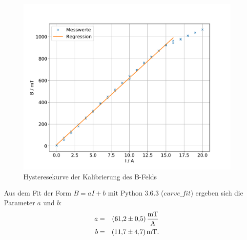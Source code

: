 %
%
\begin{figure}[h!]
  \centering
  \includegraphics[width=\textwidth]{hysterese.pdf}
  \caption{Hysteresekurve der Kalibrierung des B-Felds}
  \label{fig:hysterese}
\end{figure}
Aus dem Fit der Form $B=aI+b$ mit Python 3.6.3 ($curve\_fit$) ergeben sich die Parameter $a$ und $b$:
\begin{align*}
   a &=& \SI{61.2 \pm 0.5}{\frac{mT}{A}} \\
   b &=& \SI{11.7 \pm 4.7}{mT}. \\
\end{align*}

\FloatBarrier
